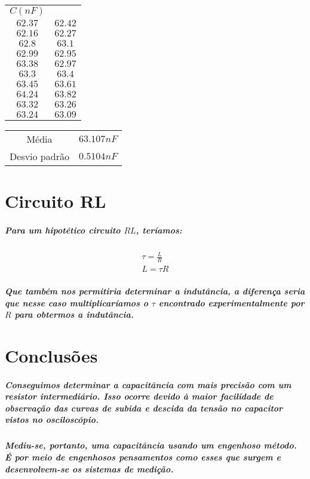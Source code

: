 \documentclass[12pt,twoside, a4paper, twocolumn]{article}
\begin{document}
\begin{center}
    \begin{tabular}{ |cc| }
        \hline
        $ C (nF)$ &         \\
        $62.37$   & $62.42$ \\
        $62.16$   & $62.27$ \\
        $62.8$    & $63.1$  \\
        $62.99$   & $62.95$ \\
        $63.38$   & $62.97$ \\
        $63.3$    & $63.4$  \\
        $63.45$   & $63.61$ \\
        $64.24$   & $63.82$ \\
        $63.32$   & $63.26$ \\
        $63.24$   & $63.09$ \\
        \hline
    \end{tabular}
\end{center}

\begin{center}
    \begin{tabular}{ |cc| }
        \hline
        Média         & $63.107 nF$ \\
        Desvio padrão & $0.5104 nF$ \\
        \hline
    \end{tabular}
\end{center}

\section{Circuito RL}

\subparagraph*{Para um hipotético circuito $RL$, teríamos:}

\begin{equation}
    \begin{aligned}
        \tau = \frac{L}{R} \\
        L = \tau R
    \end{aligned}
\end{equation}

\subparagraph*{Que também nos permitiria determinar a indutância, a diferença seria que nesse caso multiplicaríamos o $\tau$ encontrado experimentalmente por $R$ para obtermos a indutância.}

\section{Conclusões}

\subparagraph*{Conseguimos determinar a capacitância com mais precisão com um resistor intermediário. Isso ocorre devido à maior facilidade de observação das curvas de subida e descida da tensão no capacitor vistos no osciloscópio.}

\subparagraph*{Mediu-se, portanto, uma capacitância usando um engenhoso método. É por meio de engenhosos pensamentos como esses que surgem e desenvolvem-se os sistemas de medição.}
\end{document}
